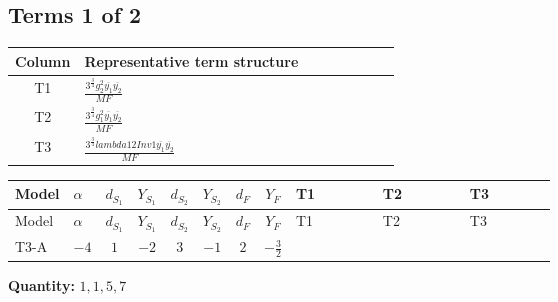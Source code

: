 \documentclass[8pt]{article}
\begin{document}
\begin{landscape}
\subsection*{Terms 1 of 2}
\begin{center}
\begin{tabular}{@{}c >{\raggedright\arraybackslash}p{0.82\linewidth}@{}}
\toprule
Column & Representative term structure \\
\midrule
T1 & \(\displaystyle \frac{3^{\frac{3}{4}} g_{2}^{2} \overline{y_{1}} \overline{y_{2}}}{MF}\) \\
\midrule
T2 & \(\displaystyle \frac{3^{\frac{3}{4}} g_{1}^{2} \overline{y_{1}} \overline{y_{2}}}{MF}\) \\
\midrule
T3 & \(\displaystyle \frac{3^{\frac{3}{4}} lambda12Inv1 \overline{y_{1}} \overline{y_{2}}}{MF}\) \\
\midrule
\bottomrule
\end{tabular}
\end{center}
\smallskip
\tiny
\begin{longtable}{@{}llcccccc >{\raggedright\arraybackslash}p{0.21\linewidth} >{\raggedright\arraybackslash}p{0.21\linewidth} >{\raggedright\arraybackslash}p{0.21\linewidth}@{}}
\toprule
Model & $\alpha$ & $d_{S_1}$ & $Y_{S_1}$ & $d_{S_2}$ & $Y_{S_2}$ & $d_F$ & $Y_F$ & T1 & T2 & T3 \\
\midrule
\endfirsthead
\toprule
Model & $\alpha$ & $d_{S_1}$ & $Y_{S_1}$ & $d_{S_2}$ & $Y_{S_2}$ & $d_F$ & $Y_F$ & T1 & T2 & T3 \\
\midrule
\endhead
T3-A & $-4$ & $1$ & $-2$ & $3$ & $-1$ & $2$ & $-\frac{3}{2}$ & \scriptsize\adjustbox{max width=\linewidth}{$\begin{gathered} - \frac{11 \cdot 3^{\frac{3}{4}} g_{2}^{2} \overline{y_{1}} \overline{y_{2}}}{8 MF}\end{gathered}$} & \scriptsize\adjustbox{max width=\linewidth}{$\begin{gathered} - \frac{9 \cdot 3^{\frac{3}{4}} g_{1}^{2} \overline{y_{1}} \overline{y_{2}}}{8 MF}\end{gathered}$} & \scriptsize\adjustbox{max width=\linewidth}{$\begin{gathered} - \frac{3^{\frac{3}{4}} lambda12Inv1 \overline{y_{1}} \overline{y_{2}}}{6 MF}\end{gathered}$} \\
\midrule
\bottomrule
\end{longtable}
\clearpage
\noindent\textbf{Quantity: }$\mathrm{1,1,5,7}$\par\smallskip

\end{landscape}
\end{document}
